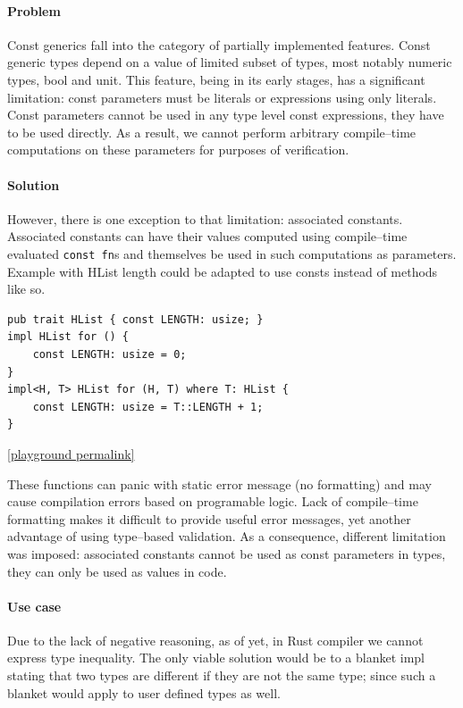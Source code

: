 \paragraph{Problem}

Const generics fall into the category of partially implemented features. Const generic types depend on a value of limited subset of types, most notably numeric types, bool and unit.
This feature, being in its early stages, has a significant limitation: const parameters must be literals or expressions using only literals. 
Const parameters cannot be used in any type level const expressions, they have to be used directly. 
As a result, we cannot perform arbitrary compile--time computations on these parameters for purposes of verification.

\paragraph{Solution}

However, there is one exception to that limitation: associated constants. Associated constants can have their values computed using compile--time evaluated \texttt{const fn}s and themselves be used in such computations as parameters.
Example with HList length could be adapted to use consts instead of methods like so.

\begin{lstlisting}
pub trait HList { const LENGTH: usize; }
impl HList for () {
    const LENGTH: usize = 0;
}
impl<H, T> HList for (H, T) where T: HList {
    const LENGTH: usize = T::LENGTH + 1;
}
\end{lstlisting}
\noindent \href{https://play.rust-lang.org/?version=stable&mode=debug&edition=2021&gist=05d326a2dc997f8005fb06711fe6fa3f}{[playground permalink]}

These functions can panic with static error message (no formatting) and may cause compilation errors based on programable logic.
Lack of compile--time formatting makes it difficult to provide useful error messages, yet another advantage of using type--based validation.
As a consequence, different limitation was imposed: associated constants cannot be used as const parameters in types, they can only be used as values in code.

\paragraph{Use case}

Due to the lack of negative reasoning, as of yet, in Rust compiler we cannot express type inequality.
The only viable solution would be to a blanket impl stating that two types are different if they are not the same type; since such a blanket would apply to user defined types as well.

